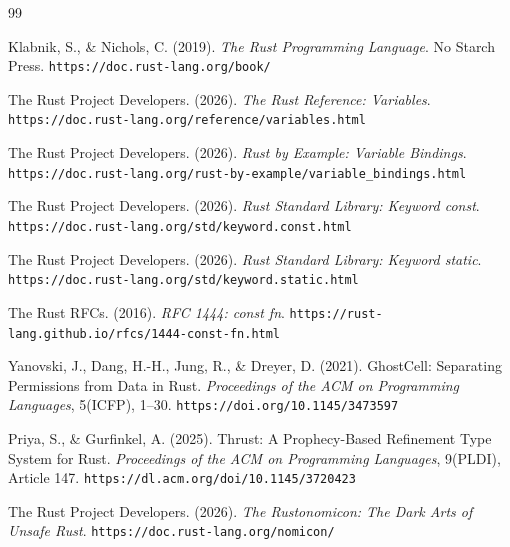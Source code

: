 \documentclass[11pt,a4paper]{article}
\begin{document}
\begin{thebibliography}{99}
	\raggedright
	Klabnik, S., \& Nichols, C. (2019).
	\textit{The Rust Programming Language}.
	No Starch Press.
	\texttt{https://doc.rust-lang.org/book/}

	The Rust Project Developers. (2026).
	\textit{The Rust Reference: Variables}.
	\texttt{https://doc.rust-lang.org/reference/variables.html}

	The Rust Project Developers. (2026).
	\textit{Rust by Example: Variable Bindings}.
	\texttt{https://doc.rust-lang.org/rust-by-example/variable_bindings.html}

	The Rust Project Developers. (2026).
	\textit{Rust Standard Library: Keyword const}.
	\texttt{https://doc.rust-lang.org/std/keyword.const.html}

	The Rust Project Developers. (2026).
	\textit{Rust Standard Library: Keyword static}.
	\texttt{https://doc.rust-lang.org/std/keyword.static.html}

	The Rust RFCs. (2016).
	\textit{RFC 1444: const fn}.
	\texttt{https://rust-lang.github.io/rfcs/1444-const-fn.html}

	Yanovski, J., Dang, H.-H., Jung, R., \& Dreyer, D. (2021).
	GhostCell: Separating Permissions from Data in Rust.
	\textit{Proceedings of the ACM on Programming Languages}, 5(ICFP), 1--30.
	\texttt{https://doi.org/10.1145/3473597}

	Priya, S., \& Gurfinkel, A. (2025).
	Thrust: A Prophecy-Based Refinement Type System for Rust.
	\textit{Proceedings of the ACM on Programming Languages}, 9(PLDI), Article 147.
	\texttt{https://dl.acm.org/doi/10.1145/3720423}

	The Rust Project Developers. (2026).
	\textit{The Rustonomicon: The Dark Arts of Unsafe Rust}.
	\texttt{https://doc.rust-lang.org/nomicon/}
\end{thebibliography}
\end{document}
